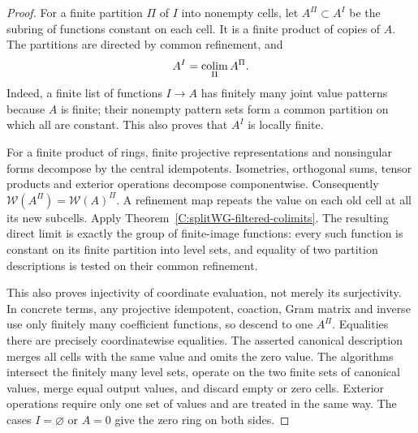 \begin{proof}
For a finite partition $\Pi$ of $I$ into nonempty cells, let
$A^\Pi\subset A^I$ be the subring of functions constant on each
cell. It is a finite product of copies of $A$. The partitions
are directed by common refinement, and
\[
 A^I=\mathop{\rm colim}_{\Pi}A^\Pi.
\]
Indeed, a finite list of functions $I\to A$ has finitely many
joint value patterns because $A$ is finite; their nonempty
pattern sets form a common partition on which all are constant.
This also proves that $A^I$ is locally finite.

For a finite product of rings, finite projective representations
and nonsingular forms decompose by the central idempotents.
Isometries, orthogonal sums, tensor products and exterior
operations decompose componentwise. Consequently
$\mathcal W(A^\Pi)=\mathcal W(A)^\Pi$.
A refinement map repeats the value on each old cell at all its
new subcells. Apply Theorem~\ref{C:splitWG-filtered-colimits}.
The resulting direct limit is exactly the group of finite-image
functions: every such function is constant on its finite
partition into level sets, and equality of two partition
descriptions is tested on their common refinement.

This also proves injectivity of coordinate evaluation, not
merely its surjectivity. In concrete terms, any projective
idempotent, coaction, Gram matrix and inverse use only finitely
many coefficient functions, so descend to one $A^\Pi$.
Equalities there are precisely coordinatewise equalities.
The asserted canonical description merges all cells with the
same value and omits the zero value. The algorithms intersect
the finitely many level sets, operate on the two finite sets of
canonical values, merge equal output values, and discard empty
or zero cells. Exterior operations require only one set of
values and are treated in the same way. The cases $I=\varnothing$
or $A=0$ give the zero ring on both sides.
\end{proof}

